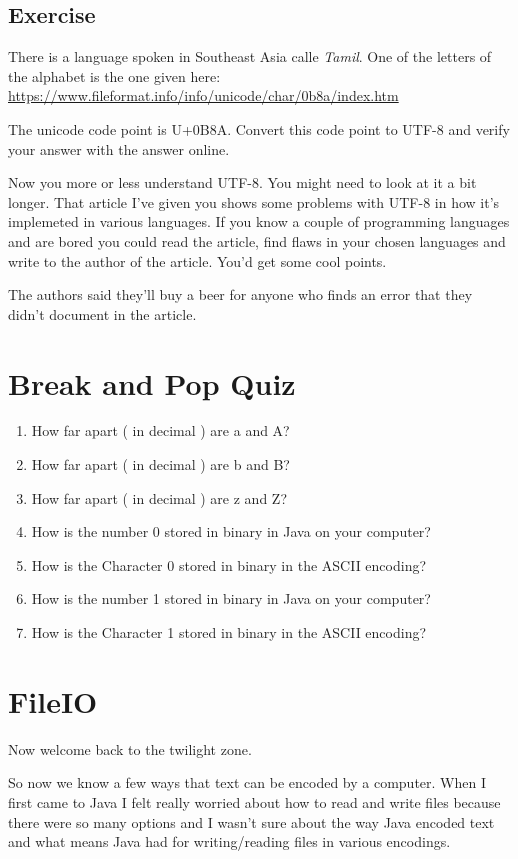 \documentclass[12pt]{article}
\begin{document}
\subsection{Exercise}
There is a language spoken in Southeast Asia calle \textit{Tamil}.
One of the letters of the alphabet is the one given here: \url{https://www.fileformat.info/info/unicode/char/0b8a/index.htm}

The unicode code point is U+0B8A. Convert this code point to UTF-8 and verify your answer with the answer online.

Now you more or less understand UTF-8. You might need to look at it a bit longer. That article I've given you shows some problems with UTF-8 in how it's implemeted in various languages. If you know a couple of programming languages and are bored you could read the article, find flaws in your chosen languages and write to the author of the article. You'd get some cool points.

The authors said they'll buy a beer for anyone who finds an error that they didn't document in the article.

\section{Break and Pop Quiz}
\begin{enumerate}
\item How far apart ( in decimal ) are a and A?
\item How far apart ( in decimal ) are b and B?
\item How far apart ( in decimal ) are z and Z?

\item How is the number 0 stored in binary in Java on your computer?
\item How is the Character 0 stored in binary in the ASCII encoding?

\item How is the number 1 stored in binary in Java on your computer?
\item How is the Character 1 stored in binary in the ASCII encoding?
\end{enumerate}

\section{FileIO}
Now welcome back to the twilight zone.

So now we know a few ways that text can be encoded by a computer. When I first came to Java I felt really worried about how to read and write files because there were so many options and I wasn't sure about the way Java encoded text and what means Java had for writing/reading files in various encodings. 
\end{document}
